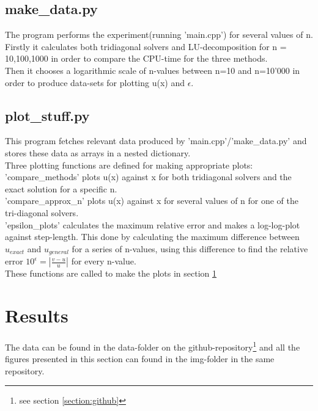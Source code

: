 \documentclass[11pt,a4paper,notitlepage]{article}
\begin{document}
\subsection{make\_data.py}
	The program performs the experiment(running 'main.cpp') for several values of n. \\
	Firstly it calculates both tridiagonal solvers and LU-decomposition for n = 10,100,1000 in order to compare the CPU-time for the three methods. \\
	Then it chooses a logarithmic scale of n-values between n=10 and n=10'000 in order to produce data-sets for plotting u(x) and $\epsilon$.

\subsection{plot\_stuff.py}
	This program fetches relevant data produced by 'main.cpp'/'make\_data.py' and stores these data as arrays in a nested dictionary. \\
	Three plotting functions are defined for making appropriate plots: \\
	'compare\_methods' plots u(x) against x for both tridiagonal solvers and the exact solution for a specific n. \\
	'compare\_approx\_n' plots u(x) against x for several values of n for one of the tri-diagonal solvers. \\
	'epsilon\_plots' calculates the maximum relative error and makes a log-log-plot against step-length. This done by calculating the maximum difference between $u_{exact}$ and $u_{general}$ for a series of n-values, using this difference to find the relative error $10^\epsilon = \left|\frac{v-u}{u}\right|$ for every n-value. \\
	These functions are called to make the plots in section \ref{section:results}

\section{Results}
\label{section:results}
	The data can be found in the data-folder on the github-repository\footnote{see section \ref{section:github}} and all the figures presented in this section can found in the img-folder in the same repository. \\
	
\end{document}
